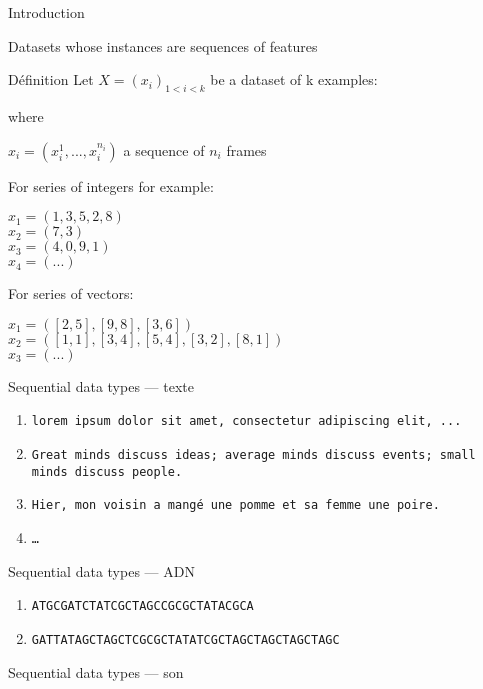 \begin{frame}{Introduction}
  \begin{center}
    Datasets whose instances are sequences of features
  \end{center}
\end{frame}

\begin{frame}{Définition}
  Let $X=(x_i)_{1<i<k}$ be a dataset of k examples:

  where

  $x_i = (x_{i}^1 , ... , x_{i}^{n_i})$ a sequence of $n_i$ frames

  For series of integers for example:

  $x_1 = (1,3,5,2,8)$ \\
  $x_2 = (7,3)$ \\
  $x_3 = (4,0,9,1)$ \\
  $x_4 = (...)$

  For series of vectors:

  $x_1 = ([2,5],[9,8],[3,6])$ \\
  $x_2 = ([1,1],[3,4],[5,4],[3,2],[8,1])$ \\
  $x_3 = (...)$ 
\end{frame}

\begin{frame}{Sequential data types --- texte}
  \begin{enumerate}
    \item \texttt{lorem ipsum dolor sit amet, consectetur adipiscing elit, ...}
    \item \texttt{Great minds discuss ideas; average minds discuss events; small minds discuss people.}
    \item \texttt{Hier, mon voisin a mangé une pomme et sa femme une poire.}
    \item \texttt{…}
  \end{enumerate}
\end{frame}

\begin{frame}{Sequential data types --- ADN}
  \begin{enumerate}
    \item \texttt{ATGCGATCTATCGCTAGCCGCGCTATACGCA}
    \item \texttt{GATTATAGCTAGCTCGCGCTATATCGCTAGCTAGCTAGCTAGC}
  \end{enumerate}
\end{frame}

\begin{frame}{Sequential data types --- son}
\end{frame}

